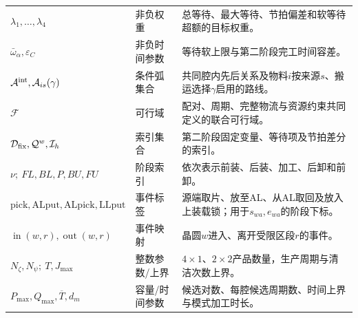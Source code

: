 \documentclass[final,5p,times,twocolumn]{elsarticle}
\begin{document}
\begin{table}[t]
\begin{tabular}{C{0.20\textwidth}C{0.16\textwidth}C{0.43\textwidth}}
$\lambda_1,\ldots,\lambda_4$ & 非负权重 & 总等待、最大等待、节拍偏差和软等待超额的目标权重。\\
$\bar\omega_\alpha,\varepsilon_C$ & 非负时间参数 & 等待软上限与第二阶段完工时间容差。\\
$\mathcal A^{\rm int},\mathcal A_{is}(\gamma)$ & 条件弧集合 & 共同腔内先后关系及物料$i$按来源$s$、搬运选择$\gamma$启用的路线。\\
$\mathcal F$ & 可行域 & 配对、周期、完整物流与资源约束共同定义的联合可行域。\\
$\mathcal D_{\rm fix},\mathcal Q^w,\mathcal I_h$ & 索引集合 & 第二阶段固定变量、等待项及节拍差分的索引。\\
$\nu;\ FL,BL,P,BU,FU$ & 阶段索引 & 依次表示前装、后装、加工、后卸和前卸。\\
$\mathrm{pick,ALput,ALpick,LLput}$ & 事件标签 & 源端取片、放至AL、从AL取回及放入上装载锁；用于$s_{wa},e_{wa}$的阶段下标。\\
$\operatorname{in}(w,r),\operatorname{out}(w,r)$ & 事件映射 & 晶圆$w$进入、离开受限区段$r$的事件。\\
$N_{\zeta},N_{\psi};\ T,J_{\max}$ & 整数参数/上界 & $4\times1$、$2\times2$产品数量，生产周期与清洁次数上界。\\
$P_{\max},Q_{\max},\overline T,d_m$ & 容量/时间参数 & 候选对数、每腔候选周期数、时间上界与模式加工时长。\\
\bottomrule
\end{tabular}
\end{table}
\end{document}
